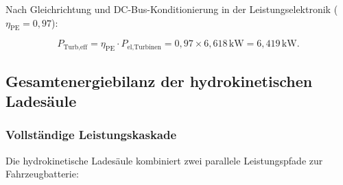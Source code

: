 ﻿\documentclass[a4paper,12pt]{article}
\begin{document}
Nach Gleichrichtung und DC-Bus-Konditionierung in der Leistungselektronik
($\eta_\text{PE} = 0{,}97$):

\begin{equation}
  P_\text{Turb,eff} = \eta_\text{PE} \cdot P_\text{el,Turbinen}
                    = 0{,}97 \times 6{,}618\,\text{kW}
                    = 6{,}419\,\text{kW}.
  \label{eq:P_turb_eff}
\end{equation}

\subsection{Gesamtenergiebilanz der hydrokinetischen Ladesäule}

\subsubsection{Vollständige Leistungskaskade}

Die hydrokinetische Ladesäule kombiniert zwei parallele Leistungspfade zur
Fahrzeugbatterie:
\end{document}
